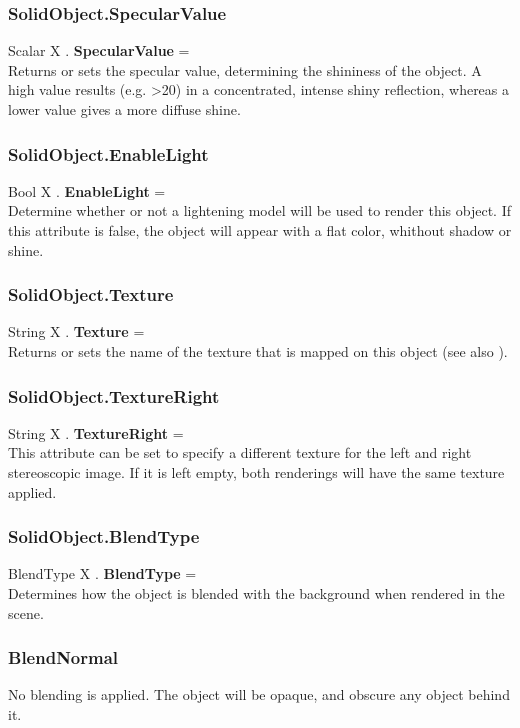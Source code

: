 \subsubsection{SolidObject.SpecularValue \label{F:SolidObject:SpecularValue}}
Scalar X . \textbf{SpecularValue} = \\
Returns or sets the specular value, determining the shininess of the object. A high value results (e.g. >20) in a concentrated, intense shiny reflection, whereas a lower value gives a more diffuse shine.

\subsubsection{SolidObject.EnableLight \label{F:SolidObject:EnableLight}}
Bool X . \textbf{EnableLight} = \\
Determine whether or not a lightening model will be used to render this object. If this attribute is false, the object will appear with a flat color, whithout shadow or shine.

\subsubsection{SolidObject.Texture \label{F:SolidObject:Texture}}
String X . \textbf{Texture} = \\
Returns or sets the name of the texture that is mapped on this object (see also ).

\subsubsection{SolidObject.TextureRight \label{F:SolidObject:TextureRight}}
String X . \textbf{TextureRight} = \\
This attribute can be set to specify a different texture for the left and right stereoscopic image. If it is left empty, both renderings will have the same texture applied.

\subsubsection{SolidObject.BlendType \label{F:SolidObject:BlendType}}
BlendType X . \textbf{BlendType} = \\
Determines how the object is blended with the background when rendered in the scene.

\subsubsection{BlendNormal \label{T:BlendType|BlendNormal}}
No blending is applied. The object will be opaque, and obscure any object behind it.


